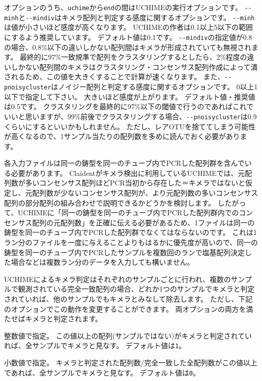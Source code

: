 \documentclass[titlepage,10pt,a4paper]{jsbook}
\begin{document}
オプションのうち、\texttt{uchime}から\texttt{end}の間はUCHIMEの実行オプションです。
\texttt{{-}{-}minh}と\texttt{{-}{-}mindiv}はキメラ配列と判定する感度に関するオプションです。
\texttt{{-}{-}minh}は値が小さいほど感度が高くなります。
UCHIMEの作者は0.1以上5以下の範囲にするよう推奨しています。
デフォルト値は0.1です。
\texttt{{-}{-}mindiv}の指定値が0.8の場合、0.8\%以下の違いしかない配列間はキメラが形成されていても無視されます。
最終的に97\%一致規準で配列をクラスタリングするとしたら、2\%程度の違いしかない配列間のキメラはクラスタリング・コンセンサス配列作成によって潰されるため、この値を大きくすることで計算が速くなります。
また、\texttt{{-}{-}pnoisycluster}はノイジー配列と判定する感度に関するオプションです。
0以上1以下で指定して下さい。
大きいほど感度が上がります。
デフォルト値・推奨値は0.5です。
クラスタリングを最終的に97\%以下の閾値で行うのであればこれでいいと思いますが、99\%前後でクラスタリングする場合、\texttt{{-}{-}pnoisycluster}は0.9くらいにするといいかもしれません。
ただし、レアOTUを捨ててしまう可能性が高くなるので、1サンプル当たりの配列数を多めに読んでおく必要があります。

各入力ファイルは同一の鋳型を同一のチューブ内でPCRした配列群を含んでいる必要があります。
Claidentがキメラ検出に利用しているUCHIMEでは、元配列数が多いコンセンサス配列ほどPCR当初から存在した＝キメラではないと仮定し、元配列数が少ないコンセンサス配列が、より元配列数の多いコンセンサス配列の部分配列の組み合わせで説明できるかどうかを検討します。
したがって、UCHIMEに「同一の鋳型を同一のチューブ内でPCRした配列群内でのコンセンサス配列の元配列数」を正確に伝える必要があるため、1ファイルは同一の鋳型を同一のチューブ内でPCRした配列群でなくてはならないのです。
これは1ラン分のファイルを一度に与えることよりもはるかに優先度が高いので、同一の鋳型を同一のチューブ内でPCRしたサンプルを複数回のランで塩基配列決定した場合などは複数ラン分のデータを入力しても構いません。

UCHIMEによるキメラ判定はそれぞれのサンプルごとに行われ、複数のサンプルで観測されている完全一致配列の場合、どれか1つのサンプルでキメラと判定されていれば、他のサンプルでもキメラとみなして除去します。
ただし、下記のオプションでこの動作を変更することができます。
両オプションの両方を満たせばキメラと判定されます。

\begin{description}\small\setlength{\baselineskip}{1.1em}
\item[\texttt{{-}{-}minnpositive}] 整数値で指定。
この値以上の配列(サンプルではない)がキメラと判定されていれば、全サンプルでキメラと見なす。
デフォルト値は\texttt{1}。
\item[\texttt{{-}{-}minppositive}] 小数値で指定。
キメラと判定された配列数/完全一致した全配列数がこの値以上であれば、全サンプルでキメラと見なす。
デフォルト値は\texttt{0}。
\end{description}
\end{document}
